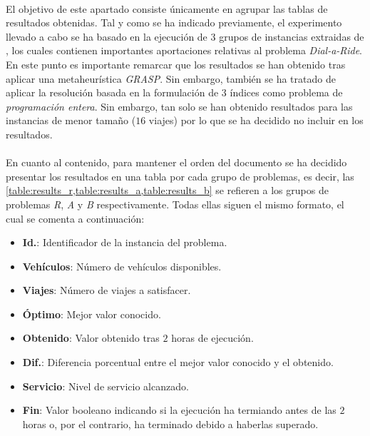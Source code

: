 \documentclass{subfiles}
\begin{document}
        \paragraph{}
        El objetivo de este apartado consiste únicamente en agrupar las tablas de resultados obtenidas. Tal y como se ha indicado previamente, el experimento llevado a cabo se ha basado en la ejecución de $3$ grupos de instancias extraidas de \cite{cordeau2003tabu,ropke2007models}, los cuales contienen importantes aportaciones relativas al problema \emph{Dial-a-Ride}. En este punto es importante remarcar que los resultados se han obtenido tras aplicar una metaheurística \emph{GRASP}. Sin embargo, también se ha tratado de aplicar la resolución basada en la formulación de $3$ índices como problema de \emph{programación entera}. Sin embargo, tan solo se han obtenido resultados para las instancias de menor tamaño ($16$ viajes) por lo que se ha decidido no incluir en los resultados.

        \paragraph{}
        En cuanto al contenido, para mantener el orden del documento se ha decidido presentar los resultados en una tabla por cada grupo de problemas, es decir, las \cref{table:results_r,table:results_a,table:results_b} se refieren a los grupos de problemas \emph{R}, \emph{A} y \emph{B} respectivamente. Todas ellas siguen el mismo formato, el cual se comenta a continuación:

        \begin{itemize}
          \item \textbf{Id.}: Identificador de la instancia del problema.
          \item \textbf{Vehículos}: Número de vehículos disponibles.
          \item \textbf{Viajes}: Número de viajes a satisfacer.
          \item \textbf{Óptimo}: Mejor valor conocido.
          \item \textbf{Obtenido}: Valor obtenido tras $2$ horas de ejecución.
          \item \textbf{Dif.}: Diferencia porcentual entre el mejor valor conocido y el obtenido.
          \item \textbf{Servicio}: Nivel de servicio alcanzado.
          \item \textbf{Fin}: Valor booleano indicando si la ejecución ha termiando antes de las $2$ horas o, por el contrario, ha terminado debido a haberlas superado.
        \end{itemize}
\end{document}
